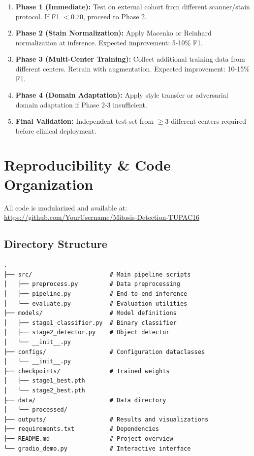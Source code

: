 \documentclass[11pt,a4paper]{article}
\begin{document}
\begin{enumerate}
    \item \textbf{Phase 1 (Immediate):} Test on external cohort from different 
          scanner/stain protocol. If F1 $< 0.70$, proceed to Phase 2.
    
    \item \textbf{Phase 2 (Stain Normalization):} Apply Macenko or Reinhard 
          normalization at inference. Expected improvement: 5-10\% F1.
    
    \item \textbf{Phase 3 (Multi-Center Training):} Collect additional training 
          data from different centers. Retrain with augmentation. Expected 
          improvement: 10-15\% F1.
    
    \item \textbf{Phase 4 (Domain Adaptation):} Apply style transfer or 
          adversarial domain adaptation if Phase 2-3 insufficient.
    
    \item \textbf{Final Validation:} Independent test set from $\geq 3$ different 
          centers required before clinical deployment.
\end{enumerate}

\section{Reproducibility \& Code Organization}

All code is modularized and available at: 
\url{https://github.com/YourUsername/Mitosis-Detection-TUPAC16}

\subsection{Directory Structure}

\begin{lstlisting}
.
├── src/                      # Main pipeline scripts
│   ├── preprocess.py         # Data preprocessing
│   ├── pipeline.py           # End-to-end inference
│   └── evaluate.py           # Evaluation utilities
├── models/                   # Model definitions
│   ├── stage1_classifier.py  # Binary classifier
│   ├── stage2_detector.py    # Object detector
│   └── __init__.py
├── configs/                  # Configuration dataclasses
│   └── __init__.py
├── checkpoints/              # Trained weights
│   ├── stage1_best.pth
│   └── stage2_best.pth
├── data/                     # Data directory
│   └── processed/
├── outputs/                  # Results and visualizations
├── requirements.txt          # Dependencies
├── README.md                 # Project overview
└── gradio_demo.py            # Interactive interface
\end{lstlisting}
\end{document}
